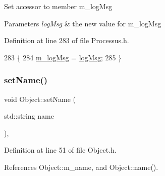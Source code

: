Set accessor to member m\+\_\+log\+Msg 
\begin{DoxyParams}{Parameters}
{\em log\+Msg} & the new value for m\+\_\+log\+Msg \\
\hline
\end{DoxyParams}


Definition at line 283 of file Processus.\+h.


\begin{DoxyCode}
283                                     \{
284     \hyperlink{classProcessus_a3bc0140a3a69a83951ab7f9986bd2c84}{m\_logMsg} = \hyperlink{classProcessus_a42fdeb17dc13ba854222666b6aa29b61}{logMsg};
285   \}
\end{DoxyCode}
\mbox{\label{classObject_ae30fea75683c2d149b6b6d17c09ecd0c}} 
\subsubsection{\texorpdfstring{set\+Name()}{setName()}}
{\footnotesize\ttfamily void Object\+::set\+Name (\begin{DoxyParamCaption}\item[{std\+::string}]{name }\end{DoxyParamCaption})\hspace{0.3cm}{\ttfamily [inline]}, {\ttfamily [inherited]}}



Definition at line 51 of file Object.\+h.



References Object\+::m\+\_\+name, and Object\+::name().



